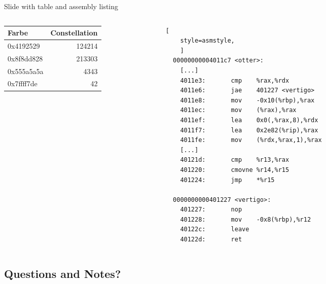 \documentclass[10pt,aspectratio=1610]{beamer}
\begin{document}
\begin{frame}[fragile]{Slide with table and assembly listing}
    \begin{columns}
        \begin{column}{0.35\textwidth}
\begin{table}[h!]
    \centering
    \begin{tabular}{|l|r|}
        \hline
        \textbf{Farbe} & \textbf{Constellation}\\
        \hline
        0x4192529 & 124214\\
        \hline
        0x8f8dd828 & 213303\\
        \hline
        0x555a5a5a & 4343\\
        \hline
        0x7ffff7de & 42\\
        \hline              
    \end{tabular}
\end{table}
        \end{column}

        \begin{column}{0.625\textwidth}
\begin{lstlisting}[
    style=asmstyle,
    ]
  00000000004011c7 <otter>:
    [...]
    4011e3:       cmp    %rax,%rdx
    4011e6:       jae    401227 <vertigo>
    4011e8:       mov    -0x10(%rbp),%rax
    4011ec:       mov    (%rax),%rax
    4011ef:       lea    0x0(,%rax,8),%rdx
    4011f7:       lea    0x2e82(%rip),%rax
    4011fe:       mov    (%rdx,%rax,1),%rax
    [...]
    40121d:       cmp    %r13,%rax
    401220:       cmovne %r14,%r15
    401224:       jmp    *%r15
  
  0000000000401227 <vertigo>:
    401227:       nop      
    401228:       mov    -0x8(%rbp),%r12
    40122c:       leave           
    40122d:       ret   
\end{lstlisting}
        \end{column}
    \begin{column}{0.025\textwidth}
    \end{column}
    \end{columns}
\end{frame}

\begin{frame}[fragile]{}
    \section{Questions and Notes?}
\end{frame}
\end{document}
